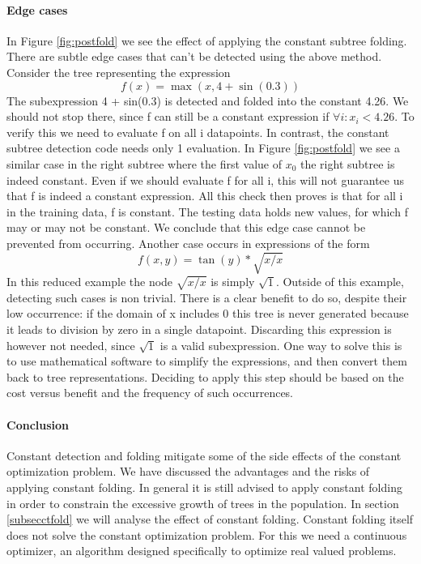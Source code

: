 \paragraph{Edge cases}
In Figure \ref{fig:postfold} we see the effect of applying the constant subtree folding. 
There are subtle edge cases that can't be detected using the above method. Consider the tree representing the expression
\[
f(x) = \max(x, 4 + \sin(0.3)) 
\]
The subexpression 4 + sin(0.3) is detected and folded into the constant 4.26. 
We should not stop there, since f can still be a constant expression if $\forall i :  x_i < 4.26$. To verify this we need to evaluate f on all i datapoints. In contrast, the constant subtree detection code needs only 1 evaluation. In Figure \ref{fig:postfold} we see a similar case in the right subtree where the first value of $x_0$ the right subtree is indeed constant. 
Even if we should evaluate f for all i, this will not guarantee us that f is indeed a constant expression. All this check then proves is that for all i in the training data, f is constant. The testing data holds new values, for which f may or may not be constant. We conclude that this edge case cannot be prevented from occurring.
Another case occurs in expressions of the form 
\[
f(x, y) = \tan(y) * \sqrt{x/x}
\]
In this reduced example the node $\sqrt{x/x}$ is simply $\sqrt{1}$. Outside of this example, detecting such cases is non trivial. There is a clear benefit to do so, despite their low occurrence: if the domain of x includes 0 this tree is never generated because it leads to division by zero in a single datapoint. Discarding this expression is however not needed, since $\sqrt{1}$ is a valid subexpression. One way to solve this is to use mathematical software to simplify the expressions, and then convert them back to tree representations. Deciding to apply this step should be based on the cost versus benefit and the frequency of such occurrences. 

\paragraph{Conclusion}
Constant detection and folding mitigate some of the side effects of the constant optimization problem. We have discussed the advantages and the risks of applying constant folding. In general it is still advised to apply constant folding in order to constrain the excessive growth of trees in the population. In section
\ref{subsecctfold} we will analyse the effect of constant folding.
Constant folding itself does not solve the constant optimization problem.
For this we need a continuous optimizer, an algorithm designed specifically to optimize real valued problems.

